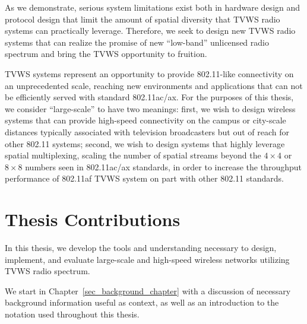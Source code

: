 	As we demonstrate, serious system limitations exist both in hardware design and protocol design that limit the amount of spatial diversity that \ac{TVWS} radio systems can practically leverage.		
	Therefore, we seek to design new \ac{TVWS} radio systems that can realize the promise of new ``low-band'' unlicensed radio spectrum and bring the \ac{TVWS} opportunity to fruition.
	
			\ac{TVWS} systems represent an opportunity to provide 802.11-like connectivity on an unprecedented scale, reaching new environments and applications that can not be efficiently served with standard 802.11ac/ax.
			For the purposes of this thesis, we consider ``large-scale'' to have two meanings: first, we wish to design wireless systems that can provide high-speed connectivity on the campus or city-scale distances typically associated with television broadcasters but out of reach for other 802.11 systems; second, we wish to design systems that highly leverage spatial multiplexing, scaling the number of spatial streams beyond the $4\times 4$ or $8\times 8$ numbers seen in 802.11ac/ax standards, in order to increase the throughput performance of 802.11af \ac{TVWS} system on part with other 802.11 standards.

\section{Thesis Contributions}
\label{sec_contributions}

In this thesis, we develop the tools and understanding necessary to design, implement, and evaluate large-scale and high-speed wireless networks utilizing \ac{TVWS} radio spectrum.

	We start in Chapter~\ref{sec_background_chapter} with a discussion of necessary background information useful as context, as well as an introduction to the notation used throughout this thesis.

